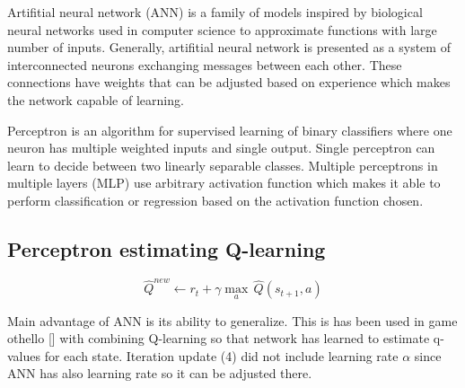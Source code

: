 \documentclass[12pt, oneside]{book}
\begin{document}
    Artifitial neural network (ANN) is a family of models inspired by biological
    neural networks used in computer science to approximate functions with
    large number of inputs. Generally, artifitial neural network is presented
    as a system of interconnected neurons exchanging messages between each
    other. These connections have weights that can be adjusted based on
    experience which makes the network capable of learning.

    Perceptron is an algorithm for supervised learning of binary classifiers
    where one neuron has multiple weighted inputs and single output. Single
    perceptron can learn to decide between two linearly separable
    classes. Multiple perceptrons in multiple layers (MLP) use arbitrary
    activation function which makes it able to perform classification or
    regression based on the activation function chosen.

  \subsection{Perceptron estimating Q-learning}
    \begin{figure}
      \vspace*{-1.15cm}
      \begin{equation}
        \label{eqn:mertensestimate}
        \hat{Q}^{new}
        \leftarrow r_t + {\gamma}{\max_a}\,\hat{Q}(s_{t+1}, a)
      \end{equation}
      \vspace*{-0.95cm}
    \end{figure}

    Main advantage of ANN is its ability to generalize. This is has been used
    in game othello [\cite{othello}] with combining Q-learning so that network
    has learned to estimate q-values for each state. Iteration update (4) did
    not include learning rate $\alpha$ since ANN has also learning rate so it
    can be adjusted there.

\renewcommand\bibname{References}


\end{document}

